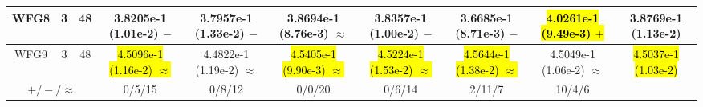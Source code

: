 \documentclass[journal]{IEEEtran}
\begin{document}
\begin{table*}[htbp]
\begin{tabular}{cccccccccc}
\hline
\multirow{1}{*}{WFG8}&3&48&3.8205e-1 (1.01e-2) $-$&3.7957e-1 (1.33e-2) $-$&3.8694e-1 (8.76e-3) $\approx$&3.8357e-1 (1.00e-2) $-$&3.6685e-1 (8.71e-3) $-$&\hl{4.0261e-1 (9.49e-3) $+$}&3.8769e-1 (1.13e-2)\\
\hline
\multirow{1}{*}{WFG9}&3&48&\hl{4.5096e-1 (1.16e-2) $\approx$}&4.4822e-1 (1.19e-2) $\approx$&\hl{4.5405e-1 (9.90e-3) $\approx$}&\hl{4.5224e-1 (1.53e-2) $\approx$}&\hl{4.5644e-1 (1.38e-2) $\approx$}&4.5049e-1 (1.06e-2) $\approx$&\hl{4.5037e-1 (1.03e-2)}\\
\hline
\multicolumn{3}{c}{$+/-/\approx$}&0/5/15&0/8/12&0/0/20&0/6/14&2/11/7&10/4/6&\\
\bottomrule
\end{tabular}
\label{No Label}
\end{table*}
\end{document}
